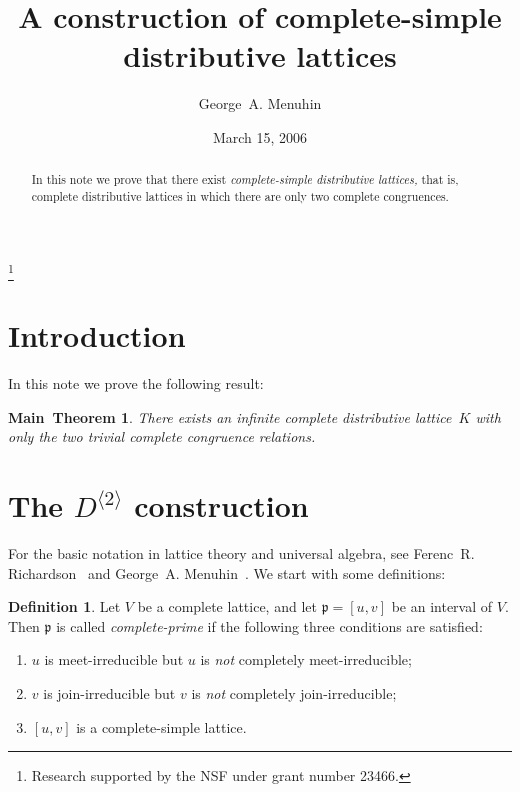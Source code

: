\documentclass{amsart}
\theoremstyle{plain}
\newtheorem*{main}{Main~Theorem}
\theoremstyle{definition}
\newtheorem{definition}{Definition}
\theoremstyle{remark}
\numberwithin{equation}{section}
\begin{document}
\title[Complete-simple distributive lattices]
      {A construction of complete-simple\\  
       distributive lattices}
\author{George~A. Menuhin}
\address{Computer Science Department\\
         University of Winnebago\\
         Winnebago, MN 53714} 
\thanks{Research supported by the NSF under grant number
23466.}  
\date{March 15, 2006}
\begin{abstract}
   In this note we prove that there exist \emph{complete-simple distributive
   lattices,} that is, complete distributive lattices in which there are 
   only two complete congruences. 
\end{abstract}

\maketitle

\section{Introduction}\label{S:intro} 
In this note we prove the following result:

\begin{main} 
   There exists an infinite complete distributive lattice~$K$ with only 
   the two trivial complete congruence relations.
\end{main}

\section{The $D^{\langle 2 \rangle}$ construction}\label{S:Ds} 
For the basic notation in lattice theory and universal algebra, see Ferenc~R.
Richardson~\cite{fR82} and George~A. Menuhin~\cite{gM68}.  We start with some
definitions:

\begin{definition}\label{D:prime}
   Let $V$ be a complete lattice, and let $\mathfrak{p} = [u, v]$ be
   an interval of $V$.  Then $\mathfrak{p}$ is called 
   \emph{complete-prime} if the following three conditions are satisfied:
   \begin{enumerate}
      \item $u$ is meet-irreducible but $u$ is \emph{not}
         completely meet-irreducible;\label{m-i}
      \item $v$ is join-irreducible but $v$ is \emph{not} 
         completely join-irreducible;\label{j-i}
      \item $[u, v]$ is a complete-simple lattice.\label{c-s}
   \end{enumerate}
\end{definition}
\end{document}

